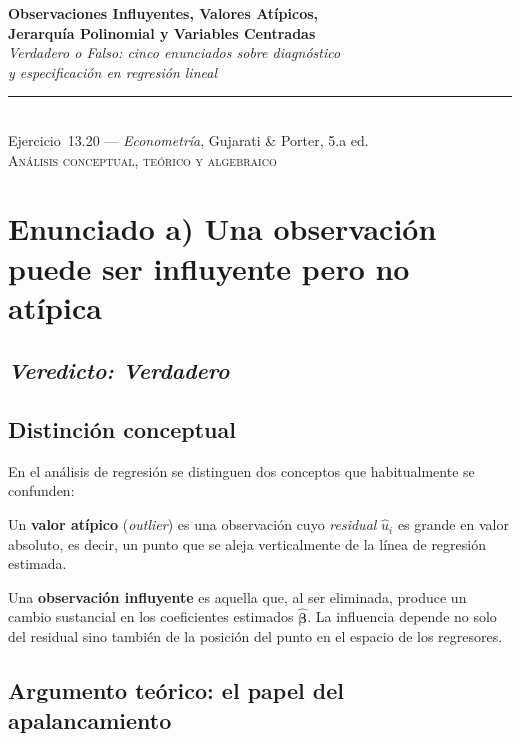\documentclass[12pt, letterpaper]{article}
\begin{document}
\begin{center}
  {\LARGE\bfseries Observaciones Influyentes, Valores Atípicos,}\\[6pt]
  {\LARGE\bfseries Jerarquía Polinomial y Variables Centradas}\\[12pt]
  {\large\itshape Verdadero o Falso: cinco enunciados sobre diagnóstico}\\
  {\large\itshape y especificación en regresión lineal}\\[14pt]
  \rule{0.55\linewidth}{0.6pt}\\[8pt]
  {\normalsize Ejercicio~13.20 --- \textit{Econometría}, Gujarati \& Porter, 5.a ed.}\\[4pt]
  {\small\textsc{Análisis conceptual, teórico y algebraico}}
\end{center}

\vspace{10pt}

\section{Enunciado a) Una observación puede ser influyente pero no atípica}

\subsection*{\textit{Veredicto: \textbf{Verdadero}}}

\subsection{Distinción conceptual}

En el análisis de regresión se distinguen dos conceptos que habitualmente
se confunden:

Un \textbf{valor atípico} (\textit{outlier}) es una observación cuyo
\emph{residual} $\hat{u}_i$ es grande en valor absoluto, es decir, un
punto que se aleja verticalmente de la línea de regresión estimada.

Una \textbf{observación influyente} es aquella que, al ser eliminada,
produce un cambio sustancial en los coeficientes estimados
$\hat{\boldsymbol{\beta}}$. La influencia depende no solo del residual
sino también de la posición del punto en el espacio de los regresores.

\subsection{Argumento teórico: el papel del apalancamiento}
\end{document}
